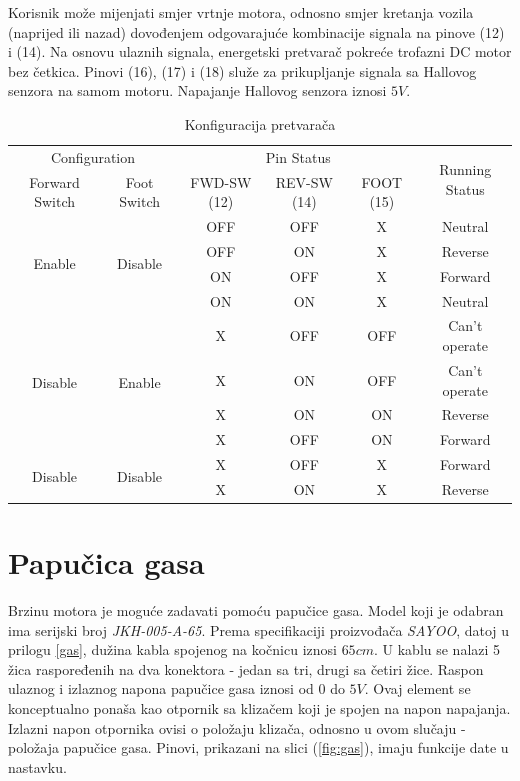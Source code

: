 Korisnik može mijenjati smjer vrtnje motora, odnosno smjer kretanja vozila (naprijed ili nazad) dovođenjem odgovarajuće kombinacije signala na pinove (12) i (14). Na osnovu ulaznih signala, energetski pretvarač pokreće trofazni DC motor bez četkica. Pinovi (16), (17) i (18) služe za prikupljanje signala sa Hallovog senzora na samom motoru. Napajanje Hallovog senzora iznosi $5V$.



\begin{table}[]
\centering
\begin{tabular}{|c|c|c|c|c|c|}
\hline
\multicolumn{2}{|c|}{Configuration} & \multicolumn{3}{c|}{Pin Status} & \multirow{2}{*}{Running Status} \\ \cline{1-5}
Forward Switch & Foot Switch & FWD-SW (12) & REV-SW (14) & FOOT (15) &  \\ \hline
\multirow{4}{*}{Enable} & \multirow{4}{*}{Disable} & OFF & OFF & X & Neutral \\ \cline{3-6} 
 &  & OFF & ON & X & Reverse \\ \cline{3-6} 
 &  & ON & OFF & X & Forward \\ \cline{3-6} 
 &  & ON & ON & X & Neutral \\ \hline
\multirow{4}{*}{Disable} & \multirow{4}{*}{Enable} & X & OFF & OFF & Can't operate \\ \cline{3-6} 
 &  & X & ON & OFF & Can't operate \\ \cline{3-6} 
 &  & X & ON & ON & Reverse \\ \cline{3-6} 
 &  & X & OFF & ON & Forward \\ \hline
\multirow{2}{*}{Disable} & \multirow{2}{*}{Disable} & X & OFF & X & Forward \\ \cline{3-6} 
 &  & X & ON & X & Reverse \\ \hline
\end{tabular}
\caption{Konfiguracija pretvarača}
\label{tab:konfiguracija}
\end{table}

\section{Papučica gasa}

\qquad Brzinu motora je moguće zadavati pomoću papučice gasa. Model koji je odabran ima serijski broj \textit{JKH-005-A-65}. Prema specifikaciji proizvođača \textit{SAYOO}, datoj u prilogu \ref{gas}, dužina kabla spojenog na kočnicu iznosi $65cm$. U kablu se nalazi 5 žica raspoređenih na dva konektora - jedan sa tri, drugi sa četiri žice. Raspon ulaznog i izlaznog napona papučice gasa iznosi od $0$ do $5V$. Ovaj element se konceptualno ponaša kao otpornik sa klizačem koji je spojen na napon napajanja. Izlazni napon otpornika ovisi o položaju klizača, odnosno u ovom slučaju - položaja papučice gasa. Pinovi, prikazani na slici (\ref{fig:gas}), imaju funkcije date u nastavku.

